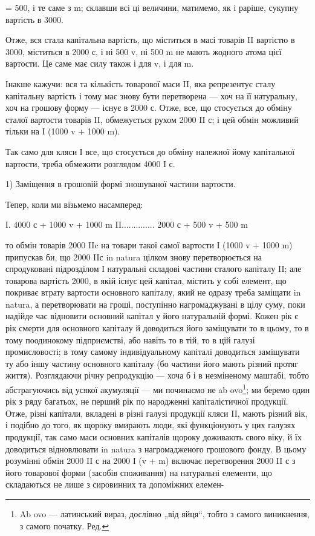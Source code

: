 = 500, і те саме з m; склавши всі ці величини, матимемо, як і раріше,
сукупну вартість в 3000.

Отже, вся стала капітальна вартість, що міститься в масі товарів II
вартістю в 3000, міститься в 2000 с, і ні 500 v, ні 500 m не мають
жодного атома цієї вартости. Це саме має силу також і для v, і для m.

Інакше кажучи: вся та кількість товарової маси II, яка репрезентує
сталу капітальну вартість і тому має знову бути перетворена — хоч
на її натуральну, хоч на грошову форму — існує в 2000 с. Отже, все, що
стосується до обміну сталої вартости товарів II, обмежується рухом 2000
II с; і цей обмін можливий тільки на І (1000 v + 1000 m).

Так само для кляси І все, що стосується до обміну належної йому
капітальної вартости, треба обмежити розглядом 4000 І с.

1) Заміщення в грошовій формі зношуваної частини вартости.

Тепер, коли ми візьмемо насамперед:

І. 4000 с + 1000 v + 1000 m
II..............  2000 с + 500 v + 500 m

то обмін товарів 2000 IIc на товари такої самої вартости І (1000 v +
1000 m) припускав би, що 2000 IIс in natura цілком знову перетворюється
на спродуковані підрозділом І натуральні складові частини сталого
капіталу II; але товарова вартість 2000, в якій існує цей капітал,
містить у собі елемент, що покриває втрату вартости основного капіталу,
який не одразу треба заміщати in natura, а перетворювати на гроші, поступінно
нагромаджувані в цілу суму, поки надійде час відновити
основний капітал у його натуральній формі. Кожен рік є рік смерти для
основного капіталу й доводиться його заміщувати то в цьому, то в тому
поодинокому підприємстві, або навіть то в тій, то в цій галузі промисловості;
в тому самому індивідуальному капіталі доводиться заміщувати
ту або іншу частину основного капіталу (бо частини його мають різний
протяг життя). Розглядаючи річну репродукцію — хоча б і в незміненому
маштабі, тобто абстрагуючись від усякої акумуляції — ми починаємо не
ab ovo\footnote*{
Ab ovo — латинський вираз, дослівно „від яйця“, тобто з самого виникнення,
з самого початку. Ред.
}; ми беремо один рік з ряду багатьох, не перший рік по
народженні капіталістичної продукції. Отже, різні капітали, вкладені
в різні галузі продукції кляси II, мають різний вік, і подібно до того,
як щороку вмирають люди, які функціонують у цих галузях продукції,
так само маси основних капіталів щороку доживають свого віку, й їх доводиться
відновлювати in natura з нагромадженого грошового фонду. В
цьому розумінні обмін 2000 II с на 2000 І (v + m) включає перетворення
2000 II с з його товарової форми (засобів споживання) на натуральні
елементи, що складаються не лише з сировинних та допоміжних елемен-